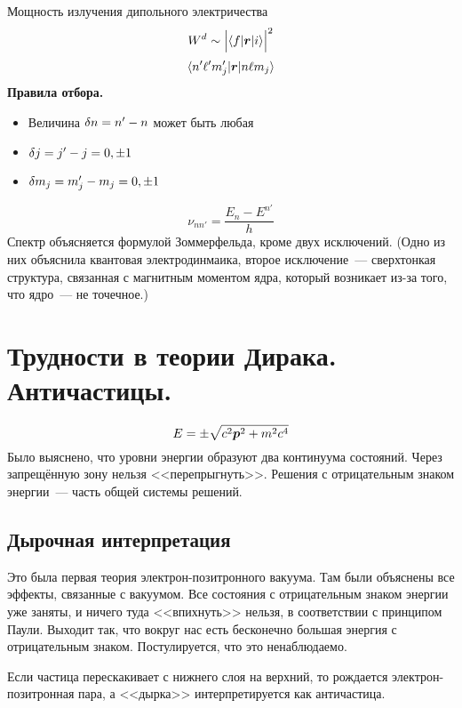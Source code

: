Мощность излучения дипольного электричества
$$
    W^{d} \sim \Big|
        \qtri{f}{\bf r}{i}
    \Big|^2
$$
$$
    \qtri{n' \l' m_j'}{\bf r}{n \l m_j}
$$
\textbf{Правила отбора.}
\begin{itemize}
  \item Величина $\dta n = n' - n$ может быть любая
  \item $\dta j = j' - j = 0, \pm 1$
  \item $\dta m_j = m_j' - m_j = 0, \pm 1$
\end{itemize}
$$
    \nu_{nn'} = \dfrac{E_n - E^{n'}}{h}
$$
Спектр объясняется формулой Зоммерфельда, кроме двух исключений. (Одно из них объяснила квантовая электродинмаика, второе исключение~--- сверхтонкая структура, связанная с магнитным моментом ядра, который возникает из-за того, что ядро~--- не точечное.)

\section{Трудности в теории Дирака. Античастицы.}
$$
    E = \pm \sqrt{c^2 \bf p^2 + m^2 c^4}
$$
Было выяснено, что уровни энергии образуют два континуума состояний. Через запрещённую зону нельзя <<перепрыгнуть>>. Решения с отрицательным знаком энергии~--- часть общей системы решений.

\subsection{Дырочная интерпретация}
Это была первая теория электрон-позитронного вакуума. Там были объяснены все эффекты, связанные с вакуумом. Все состояния с отрицательным знаком энергии уже заняты, и ничего туда <<впихнуть>> нельзя, в соответствии с принципом Паули. Выходит так, что вокруг нас есть бесконечно большая энергия с отрицательным знаком. Постулируется, что это ненаблюдаемо.

Если частица перескакивает с нижнего слоя на верхний, то рождается электрон-позитронная пара, а <<дырка>> интерпретируется как античастица.

